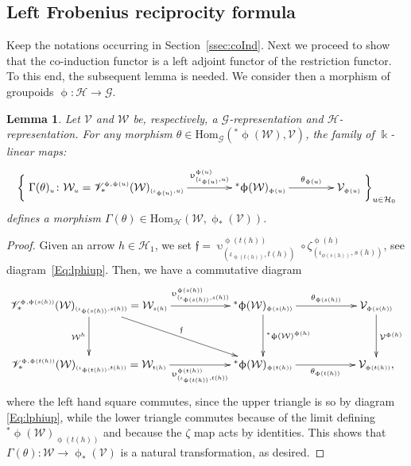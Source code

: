 \documentclass[11pt]{article}
\numberwithin{equation}{section}
\newtheorem{Lemma}[Theorem]{Lemma}
\renewcommand{\hom}[3]{\mathrm{Hom}_{\Sscript{#1}}\left(#2, #3\right)}
\newcommand{\Ho}{\cH_{\Sscript{0}}}
\newcommand{\Ha}{\cH_{\Sscript{1}}}
\newcommand{\Wu}{\cW_{\Sscript{u}}}
\newcommand{\Wh}{\cW^{\Sscript{h}}}
\newcommand{\vV}{\mathscr{V}}
\newcommand{\cG}{{\mathcal G}}
\newcommand{\cH}{{\mathcal H}}
\newcommand{\cV}{{\mathcal V}}
\newcommand{\cW}{{\mathcal W}}
\newcommand{\Sscript}[1]{\scriptscriptstyle{#1}}
\newcommand{\pls}{{}^{*}\upphi}
\begin{document}
\subsection{Left Frobenius reciprocity formula}\label{ssec:LAdj}

Keep the notations occurring in Section~\ref{ssec:coInd}. Next we proceed to show that the co-induction functor is a left adjoint functor of the restriction functor. To this end, the subsequent lemma is needed. We consider then a morphism of groupoids $\upphi\colon \cH \to \cG$.
\begin{Lemma}\label{lema:Gamma} Let $\cV$ and $\cW$ be, respectively, a $\cG$-representation and $\cH$-representation. For any morphism $\theta \in \hom{\cG}{\pls(\cW)}{\cV}$, the family of $\Bbbk$-linear maps:
\begin{gather*}
\bigg\{ \xymatrix@C=40pt{ \Gamma(\theta)_{\Sscript{u}}\colon \Wu =
\vV^{\Sscript{\upphi,\upphi(u)}}_*(\cW)_{\Sscript{(\iota_{\upphi(u)}, u)}}
\ar@{->}^-{\upupsilon^{\Sscript{\upphi(u)}}_{\Sscript{(\iota_{\upphi(u)},
 u)}} }[r] & \pls(\cW)_{\Sscript{\upphi(u)}}
\ar@{->}^-{\theta_{\Sscript{\upphi(u)}}}[r] & \cV_{\Sscript{\upphi(u)}} }\bigg\}_{u \in \Ho}
\end{gather*}
defines a morphism $\Gamma(\theta) \in \hom{\cH}{\cW}{\upphi_{*}(\cV)}$.
\end{Lemma}
\begin{proof}Given an arrow $h \in \Ha$, we set $\mathfrak{f}=\upupsilon^{\Sscript{\upphi(t(h))}}_{\Sscript{(\iota_{\upphi(t(h))},t(h))}} \circ\zeta^{\Sscript{\upphi(h)}}_{\Sscript{(\iota_{\phi(s(h))},s(h))}}$, see diagram~\eqref{Eq:lphiup}. Then, we have a commutative diagram
\begin{gather*}
\xymatrix@R=35pt{\vV^{\Sscript{\upphi,
\upphi(s(h))}}_*(\cW)_{\Sscript{(\iota_{\upphi(s(h))},s(h))}} =\cW_{\Sscript{s(h)}}
\ar@{->}^-{\upupsilon^{\Sscript{\upphi(s(h))}}_{\Sscript{(\iota_{\upphi(s(h))},s(h))}}}[rr] \ar@{->}_-{\Wh}[d] \ar@{->}^-{\mathfrak{f}}[drr] &
& \pls(\cW)_{\Sscript{\upphi(s(h))}}\ar@{->}^-{\theta_{\Sscript{\upphi(s(h))}}}[rr]\ar@{->}^-{\pls(\cW)^{\upphi(h)}}[d] & & \cV_
{\Sscript{\upphi(s(h))}} \ar@{->}^-{\cV^{\Sscript{\upphi(h)}}}[d]
\\ \vV^{\Sscript{\upphi, \upphi(t(h))}}_*(\cW)_{\Sscript{(\iota_{\upphi(t(h))}, t(h))}}=\cW_{\Sscript{t(h)}}
\ar@{->}_-{\upupsilon^{\Sscript{\upphi(t(h))}}_{\Sscript{(\iota_{\upphi(t(h))},t(h))}}}[rr] & & \pls(\cW)_{\Sscript{\upphi(t(h))}}\ar@{->}_-{\theta_{\Sscript{\upphi(t(h))}}}[rr] & & \cV_
{\Sscript{\upphi(t(h))}}, }
\end{gather*}
where the left hand square commutes, since the upper triangle is so by diagram \eqref{Eq:lphiup}, while the lower triangle commutes because of the limit defining $\pls(\cW)_{\Sscript{\upphi(t(h))}}$ and because the $\zeta$ map acts by identities. This shows that $\Gamma(\theta)\colon \cW \to \upphi_{*}(\cV)$ is a natural transformation, as desired.
\end{proof}
\end{document}
